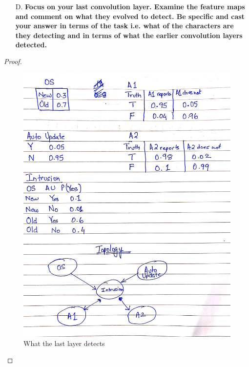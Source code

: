 \documentclass{article}
\theoremstyle{case}
\begin{document}
\begin{enumerate}
    \item [D.] \textbf{Focus on your last convolution layer. Examine the feature maps and
comment on what they evolved to detect. Be specific and cast
your answer in terms of the task i.e. what of the characters are
they detecting and in terms of what the earlier convolution layers
detected.}
\end{enumerate} 
\begin{proof}
\begin{figure}[t]
\centering
            \caption{What the last layer detects}
            \includegraphics[scale=0.6]{img3.jpg}
            

\end{figure}
\end{proof}
\end{document}
